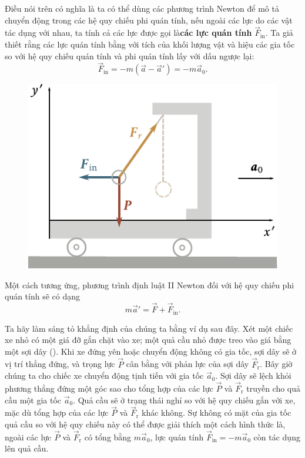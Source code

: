 Điều nói trên có nghĩa là ta có thể dùng các phương trình Newton để mô tả chuyển động trong các hệ quy chiếu phi quán tính, nếu ngoài các lực do các vật tác dụng với nhau, ta tính cả các lực được gọi là\textbf{các lực quán tính} $\vec{F}_{\text{in}}$. Ta giả thiết rằng các lực quán tính bằng với tích của khối lượng vật và hiệu các gia tốc so với hệ quy chiếu quán tính và phi quán tính lấy với dấu ngược lại:
\begin{equation}\label{eq:4_2}
\vec{F}_{\text{in}} = -m(\vec{a} - \vec{a}') = -m\vec{a}_0.
\end{equation}

\begin{figure}[!htb]
	\begin{center}
		\includegraphics[scale=0.95]{figures/ch_04/fig_4_1.pdf}
		\caption[]{}
		\label{fig:4_1}
	\end{center}
\end{figure}

\noindent
Một cách tương ứng, phương trình định luật II Newton đối với hệ quy chiếu phi quán tính sẽ có dạng
\begin{equation}\label{eq:4_3}
m\vec{a}' = \vec{F} + \vec{F}_{\text{in}}.
\end{equation}

Ta hãy làm sáng tỏ khẳng định của chúng ta bằng ví dụ sau đây. Xét một chiếc xe nhỏ có một giá đỡ gắn chặt vào xe; một quả cầu nhỏ được treo vào giá bằng một sợi dây (). Khi xe đứng yên hoặc chuyển động không có gia tốc, sợi dây sẽ ở vị trí thẳng đứng, và trọng lực $\vec{P}$ cân bằng với phản lực của sợi dây $\vec{F}_{\text{r}}$. Bây giờ chúng ta cho chiếc xe chuyển động tịnh tiến với gia tốc $\vec{a}_0$. Sợi dây sẽ lệch khỏi phương thẳng đứng một góc sao cho tổng hợp của các lực $\vec{P}$ và $\vec{F}_{\text{r}}$ truyền cho quả cầu một gia tốc $\vec{a}_0$. Quả cầu sẽ ở trạng thái nghỉ so với hệ quy chiếu gắn với xe, mặc dù tổng hợp của các lực $\vec{P}$ và $\vec{F}_{\text{r}}$ khác không. Sự không có mặt của gia tốc quả cầu so với hệ quy chiếu này có thể được giải thích một cách hình thức là, ngoài các lực $\vec{P}$ và $\vec{F}_{\text{r}}$ có tổng bằng $m\vec{a}_0$, lực quán tính $\vec{F}_{\text{in}}=-m\vec{a}_0$ còn tác dụng lên quả cầu.

